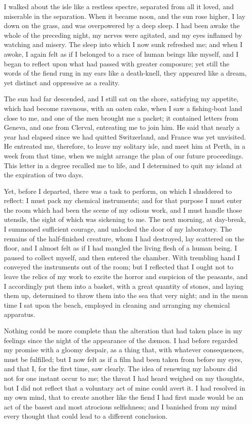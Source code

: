 I walked about the isle like a restless
spectre, separated from all it loved,
and miserable in the separation. When
it became noon, and the sun rose
higher, I lay down on the grass, and
was overpowered by a deep sleep. I
had been awake the whole of the preceding
night, my nerves were agitated,
and my eyes inflamed by watching and
misery. The sleep into which I now
sunk refreshed me; and when I awoke,
I again felt as if I belonged to a race
of human beings like myself, and I
began to reflect upon what had passed
with greater composure; yet still the
words of the fiend rung in my ears like
a death-knell, they appeared like a
dream, yet distinct and oppressive as a
reality.

The sun had far descended, and I
still sat on the shore, satisfying my appetite,
which had become rav\-en\-ous,
with an oaten cake, when I saw a fishing-boat
land close to me, and one of the
men brought me a packet; it contained
letters from Geneva, and one from
Clerval, entreating me to join him.
He said that nearly a year had elapsed
since we had quitted Switzerland, and
France was yet unvisited. He
entreated me, therefore, to leave my
solitary isle, and meet him at Perth, in
a week from that time, when we might
arrange the plan of our future proceedings.
This letter in a degree recalled
me to life, and I determined to
quit my island at the expiration of two
days.

Yet, before I departed, there was a
task to perform, on which I shuddered
to reflect: I must pack my chemical
instruments; and for that purpose I
must enter the room which had been
the scene of my odious work, and I
must handle those utensils, the sight of
which was sickening to me. The next
morning, at day-break, I summoned
sufficient courage, and unlocked the
door of my laboratory. The remains
of the half-finished creature, whom I
had destroyed, lay scattered on the
floor, and I almost felt as if I had mangled
the living flesh of a human being.
I paused to collect myself, and then
entered the chamber. With trembling
hand I conveyed the instruments out of
the room; but I reflected that I ought
not to leave the relics of my work to
excite the horror and suspicion of the
peasants, and I accordingly put them
into a basket, with a great quantity of
stones, and laying them up, determined
to throw them into the sea that very
night; and in the mean time I sat upon
the beach, employed in cleaning and
arranging my chemical apparatus.

Nothing could be more complete
than the alteration that had taken place
in my feelings since the night of the
appearance of the dæmon. I had
before regarded my promise with a
gloomy despair, as a thing that, with
whatever consequences, must be fulfilled;
but I now felt as if a film had
been taken from before my eyes, and
that I, for the first time, saw clearly.
The idea of renewing my labours did
not for one instant occur to me; the
threat I had heard weighed on my
thoughts, but I did not reflect that a
voluntary act of mine could avert it.
I had resolved in my own mind, that to
create another like the fiend I had first
made would be an act of the basest and
most atrocious selfishness; and I banished
from my mind every thought
that could lead to a different conclusion.

